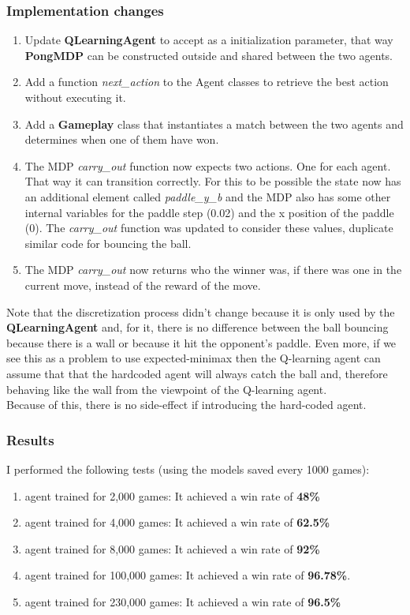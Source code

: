 \documentclass[11pt]{article}
\begin{document}
\subsubsection*{Implementation changes}
\begin{enumerate}
\item Update \textbf{QLearningAgent} to accept as a initialization parameter, that way \textbf{PongMDP} can be constructed outside and shared between the two agents.

\item Add a function \textit{next\_action} to the Agent classes to retrieve the best action without executing it.

\item Add a \textbf{Gameplay} class that instantiates a match between the two agents and determines when one of them have won.

\item The MDP \textit{carry\_out} function now expects two actions. One for each agent. That way it can transition correctly. For this to be possible the state now has an additional element called \textit{paddle\_y\_b} and the MDP also has some other internal variables for the paddle step (0.02) and the x position of the paddle (0). The \textit{carry\_out} function was updated to consider these values, duplicate similar code for bouncing the ball. 

\item The MDP \textit{carry\_out} now returns who the winner was, if there was one in the current move, instead of the reward of the move.
\end{enumerate}

Note that the discretization process didn't change because it is only used by the \textbf{QLearningAgent} and, for it, there is no difference between the ball bouncing because there is a wall or because it hit the opponent's paddle. Even more, if we see this as a problem to use expected-minimax then the Q-learning agent can assume that that the hardcoded agent will always catch the ball and, therefore behaving like the wall from the viewpoint of the Q-learning agent.\\

Because of this, there is no side-effect if introducing the hard-coded agent.

\subsubsection*{Results}
I performed the following tests (using the models saved every 1000 games): 
\begin{enumerate}
\item agent trained for 2,000 games: It achieved a win rate of \textbf{48\%}
\item agent trained for 4,000 games: It achieved a win rate of \textbf{62.5\%}
\item agent trained for 8,000 games: It achieved a win rate of \textbf{92\%}
\item agent trained for 100,000 games: It achieved a win rate of \textbf{96.78\%}.
\item agent trained for 230,000 games: It achieved a win rate of \textbf{96.5\%}
\end{enumerate}
\end{document}
